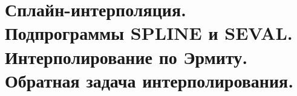 \documentclass[../../calc-math-exam-2023.tex]{subfiles}
\begin{document}
    \section{Сплайн-интерполяция. Подпрограммы \textbf{SPLINE} и \textbf{SEVAL}. Интерполирование по Эрмиту. Обратная задача интерполирования.}\label{sec:ch08}
\end{document}

